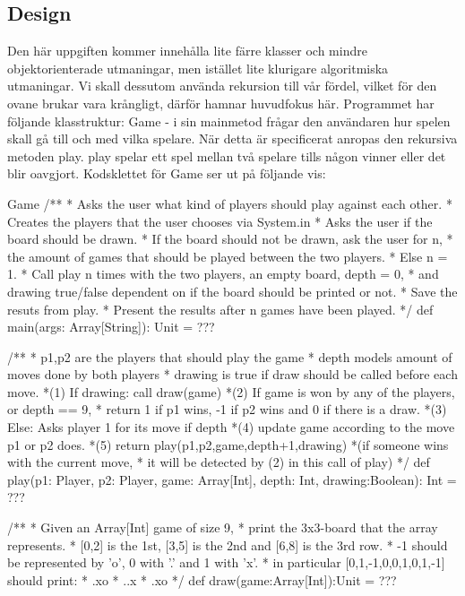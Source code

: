 \subsection{Design}
Den här uppgiften kommer innehålla lite färre klasser och mindre objektorienterade utmaningar, men istället lite klurigare algoritmiska utmaningar. Vi skall dessutom använda rekursion till vår fördel, vilket för den ovane brukar vara krångligt, därför hamnar huvudfokus här. Programmet har följande klasstruktur:
Game - i sin mainmetod frågar den användaren hur spelen skall gå till och med vilka spelare.
När detta är specificerat anropas den rekursiva metoden play.
play spelar ett spel mellan två spelare tills någon vinner eller det blir oavgjort.
Kodsklettet för Game ser ut på följande vis:
\begin{ScalaSpec}{Game}
/** 
 * Asks the user what kind of players should play against each other.
 * Creates the players that the user chooses via System.in 
 * Asks the user if the board should be drawn.
 * If the board should not be drawn, ask the user for n,
 * the amount of games that should be played between the two players.
 * Else n = 1.
 * Call play n times with the two players, an empty board, depth = 0,
 * and drawing true/false dependent on if the board should be printed or not. 
 * Save the resuts from play. 
 * Present the results after n games have been played. 
 */
def main(args: Array[String]): Unit = ???

/**
 * p1,p2 are the players that should play the game
 * depth models amount of moves done by both players
 * drawing is true if draw should be called before each move.
 *(1) If drawing: call draw(game)
 *(2) If game is won by any of the players, or depth == 9, 
 * return 1 if p1 wins, -1 if p2 wins and 0 if there is a draw.
 *(3) Else: Asks player 1 for its move if depth%
 *(4) update game according to the move p1 or p2 does.
 *(5) return play(p1,p2,game,depth+1,drawing) 
 *(if someone wins with the current move, 
 * it will be detected by (2) in this call of play)
 */
def play(p1: Player, p2: Player, game: Array[Int], 
		depth: Int, drawing:Boolean): Int = ???
	
/**
 * Given an Array[Int] game of size 9, 
 * print the 3x3-board that the array represents. 
 * [0,2] is the 1st, [3,5] is the 2nd and [6,8] is the 3rd row.
 * -1 should be represented by 'o', 0 with '.' and 1 with 'x'.
 * in particular [0,1,-1,0,0,1,0,1,-1] should print:
 * .xo
 * ..x
 * .xo
 */
def draw(game:Array[Int]):Unit = ???
\end{ScalaSpec}

